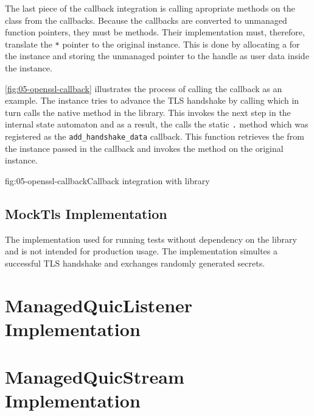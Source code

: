 The last piece of the \libopenssl{} callback integration is calling apropriate methods on the
\ManagedQuicConnection{} class from the callbacks. Because the callbacks are converted to unmanaged
function pointers, they must be  methods. Their implementation must, therefore,
translate the \texttt{\SSL{}*} pointer to the original \OpenSslTls{} instance. This is done by
allocating a  for the \OpenSslTls{} instance and storing the unmanaged pointer to
the handle as user data inside the \SSL{} instance.

\autoref{fig:05-openssl-callback} illustrates the process of calling the 
callback as an example. The \ManagedQuicConnection{} instance tries to advance the TLS handshake by
calling  which in turn calls the  native method
in the \libopenssl{} library. This invokes the next step in the internal state automaton and as a
result, the \libopenssl{} calls the static \texttt{\OpenSslTls{}.} method
which was registered as the \texttt{add_handshake_data} callback. This function retrieves the
 from the \SSL{} instance passed in the callback and invokes the
 method on the original \ManagedQuicConnection{} instance.

\begin{myFigure}{fig:05-openssl-callback}{Callback integration with \libopenssl{} library}

  \resizebox{\linewidth}{!}{}

\end{myFigure}

\subsection{MockTls Implementation}

The \MockTls{} implementation used for running tests without dependency on the \libopenssl{} library
and is not intended for production usage. The implementation simultes a successful TLS handshake and
exchanges randomly generated secrets.

\section{ManagedQuicListener Implementation}

\section{ManagedQuicStream Implementation}

